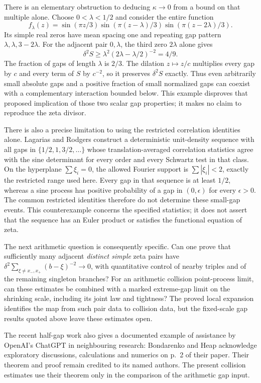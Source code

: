 There is an elementary obstruction to deducing $\kappa\to0$ from
a bound on that multiple alone. Choose $0<\lambda<1/2$ and consider
the entire function
\[
 f_\lambda(z)=\sin(\pi z/3)\sin(\pi(z-\lambda)/3)
                         \sin(\pi(z-2\lambda)/3).
\]
Its simple real zeros have mean spacing one and repeating gap pattern
$\lambda,\lambda,3-2\lambda$. For the adjacent pair $0,\lambda$,
the third zero $2\lambda$ alone gives
\[
 \delta^2 S\ge\lambda^2(2\lambda-\lambda/2)^{-2}=4/9.
\]
The fraction of gaps of length $\lambda$ is $2/3$.
The dilation $z\mapsto z/c$ multiplies every gap by $c$ and every
term of $S$ by $c^{-2}$, so it preserves $\delta^2S$ exactly.
Thus even arbitrarily small absolute gaps and a positive fraction
of small normalized gaps can coexist with a complementary interaction
bounded below. This example disproves that proposed implication of
those two scalar gap properties; it makes no claim to reproduce the
zeta divisor.

There is also a precise limitation to using the restricted correlation
identities alone. Lagarias and Rodgers
\cite[Theorem~3.1, p.~4, with the test class in Theorem~2.4, p.~3]{lagarias-rodgers}
construct a deterministic unit-density sequence with all gaps in
$\{1/2,1,3/2,\ldots\}$ whose translation-averaged correlation
statistics agree with the sine determinant for every order and every
Schwartz test in that class. On the hyperplane
$\sum\xi_i=0$, the allowed Fourier support is
$\sum|\xi_i|<2$, exactly the restricted range used here.
Every gap in that sequence is at least $1/2$, whereas a sine process
has positive probability of a gap in $(0,\epsilon)$ for every
$\epsilon>0$. The common restricted identities therefore do not
determine these small-gap events. This counterexample concerns the
specified statistics; it does not assert that the sequence has an
Euler product or satisfies the functional equation of zeta.

The next arithmetic question is consequently specific. Can one prove
that sufficiently many adjacent \emph{distinct simple} zeta pairs have
$\delta^2\sum_{\xi\ne x_-,x_+}(b-\xi)^{-2}\to0$, with quantitative
control of nearby triples and of the remaining singleton branches?
For an arithmetic collision point-process limit, can these estimates
be combined with a marked extreme-gap limit on the shrinking scale,
including its joint law and tightness? The proved local expansion
identifies the map from such pair data to collision data, but the
fixed-scale gap results quoted above leave these estimates open.

The recent half-gap work also gives a documented example of assistance
by OpenAI's ChatGPT in neighbouring research: Bondarenko and Heap
acknowledge exploratory discussions, calculations and numerics on p.~2
of their paper. Their theorem and proof remain credited to its named
authors. The present collision estimates use their theorem only in the
comparison of the arithmetic gap input.

